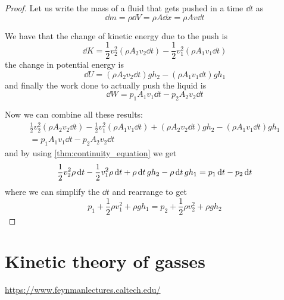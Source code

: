 \documentclass[12pt]{extarticle}
\begin{document}
\begin{proof}
    Let us write the mass of a fluid that gets pushed in a time $\dd{t}$ as
    \begin{equation}
        \dd{m} = \rho \dd{V} = \rho A \dd{x} = \rho A v \dd{t}
    \end{equation}

    We have that the change of kinetic energy due to the push is
    \begin{equation}
        \dd{K} = \frac{1}{2} v_2^2 (\rho A_2 v_2 \dd{t}) - \frac{1}{2} v_1^2 (\rho A_1 v_1 \dd{t})
    \end{equation}
    the change in potential energy is
    \begin{equation}
        \dd{U} = (\rho A_2 v_2 \dd{t})gh_2 - (\rho A_1 v_1 \dd{t})gh_1
    \end{equation}
    and finally the work done to actually push the liquid is
    \begin{equation}
        \dd{W} = p_1 A_1 v_1 \dd{t} - p_2 A_2 v_2 \dd{t}
    \end{equation}

    Now we can combine all these results:
    \begin{multline}
        \frac{1}{2} v_2^2 (\rho A_2 v_2 \dd{t}) - \frac{1}{2} v_1^2 (\rho A_1 v_1 \dd{t}) +
        (\rho A_2 v_2 \dd{t})gh_2 - (\rho A_1 v_1 \dd{t})gh_1 \\
        = p_1 A_1 v_1 \dd{t} - p_2 A_2 v_2 \dd{t}
    \end{multline}
    and by using \autoref{thm:continuity_equation} we get
    \begin{equation}
        \frac{1}{2} v_2^2 \rho \dd{t} - \frac{1}{2} v_1^2 \rho \dd{t} +
        \rho \dd{t} gh_2 - \rho \dd{t} gh_1 \\
        = p_1 \dd{t} - p_2 \dd{t}
    \end{equation}
    where we can simplify the $\dd{t}$ and rearrange to get
    \begin{equation}
        p_1 + \frac{1}{2} \rho v_1^2 + \rho g h_1 = p_2 + \frac{1}{2} \rho v_2^2 + \rho g h_2
    \end{equation}
\end{proof}

\section{Kinetic theory of gasses}

\url{https://www.feynmanlectures.caltech.edu/}
\end{document}
